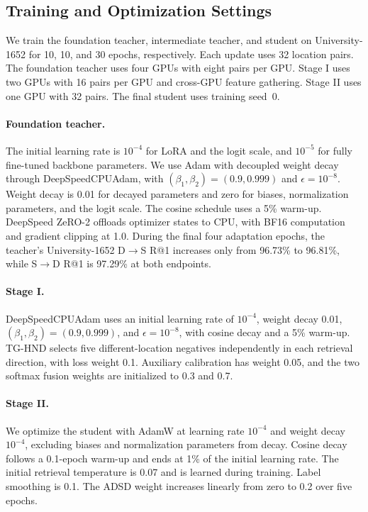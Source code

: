 \subsection{Training and Optimization Settings}
We train the foundation teacher, intermediate teacher, and student on University-1652 for 10, 10, and 30 epochs, respectively. Each update uses 32 location pairs. The foundation teacher uses four GPUs with eight pairs per GPU. Stage I uses two GPUs with 16 pairs per GPU and cross-GPU feature gathering. Stage II uses one GPU with 32 pairs. The final student uses training seed~0.

\paragraph{Foundation teacher.}
The initial learning rate is $10^{-4}$ for LoRA and the logit scale, and $10^{-5}$ for fully fine-tuned backbone parameters. We use Adam with decoupled weight decay through DeepSpeedCPUAdam, with $(\beta_1,\beta_2)=(0.9,0.999)$ and $\epsilon=10^{-8}$. Weight decay is 0.01 for decayed parameters and zero for biases, normalization parameters, and the logit scale. The cosine schedule uses a 5\% warm-up. DeepSpeed ZeRO-2 offloads optimizer states to CPU, with BF16 computation and gradient clipping at 1.0. During the final four adaptation epochs, the teacher's University-1652 D$\rightarrow$S R@1 increases only from 96.73\% to 96.81\%, while S$\rightarrow$D R@1 is 97.29\% at both endpoints.

\paragraph{Stage I.}
DeepSpeedCPUAdam uses an initial learning rate of $10^{-4}$, weight decay 0.01, $(\beta_1,\beta_2)=(0.9,0.999)$, and $\epsilon=10^{-8}$, with cosine decay and a 5\% warm-up. TG-HND selects five different-location negatives independently in each retrieval direction, with loss weight 0.1. Auxiliary calibration has weight 0.05, and the two softmax fusion weights are initialized to 0.3 and 0.7.

\paragraph{Stage II.}
We optimize the student with AdamW at learning rate $10^{-4}$ and weight decay $10^{-4}$, excluding biases and normalization parameters from decay. Cosine decay follows a 0.1-epoch warm-up and ends at 1\% of the initial learning rate. The initial retrieval temperature is 0.07 and is learned during training. Label smoothing is 0.1. The ADSD weight increases linearly from zero to 0.2 over five epochs.


